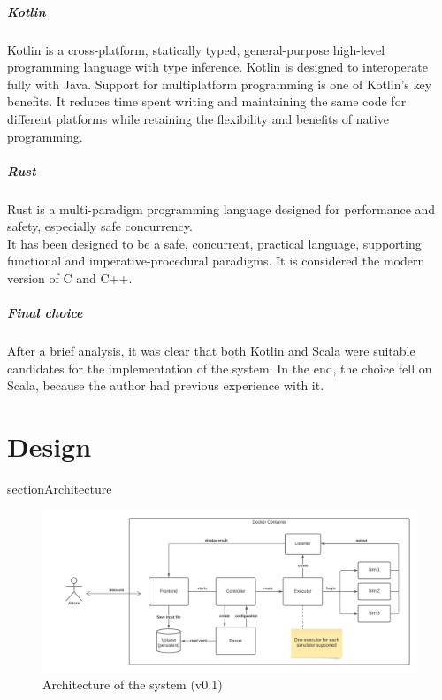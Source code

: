 \documentclass[12pt,a4paper,openright,twoside]{book}
\begin{document}
\paragraph*{Kotlin}
Kotlin is a cross-platform, statically typed, general-purpose high-level programming language with type inference. 
Kotlin is designed to interoperate fully with Java.
Support for multiplatform programming is one of Kotlin’s key benefits. It reduces time spent writing and maintaining 
the same code for different platforms while retaining the flexibility and benefits of native programming.

\paragraph*{Rust}

Rust is a multi-paradigm programming language designed for performance and safety, especially safe concurrency. \\
It has been designed to be a safe, concurrent, practical language, supporting functional and imperative-procedural paradigms.
It is considered the modern version of C and C++.

\paragraph*{Final choice}
After a brief analysis, it was clear that both Kotlin and Scala were suitable candidates for the implementation of the system.
In the end, the choice fell on Scala, because the author had previous experience with it.

\chapter{Design}

section{Architecture}

\begin{figure}
    \centering
    \includegraphics[width=.8\linewidth]{figures/architecture.png}
    \caption{Architecture of the system (v0.1)}
    \label{fig:random-image}
\end{figure}
\end{document}
